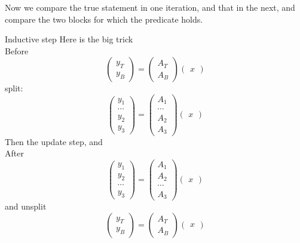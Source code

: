 Now we compare the true statement in one iteration,
and that in the next, and compare the two blocks
for which the predicate holds.

\begin{block}{Inductive step}
  \small
  Here is the big trick\\
  Before
  \[
  \begin{pmatrix}
    y_T\\ y_B
  \end{pmatrix}
  =
  \begin{pmatrix}
    A_T\\ A_B
  \end{pmatrix}
  \begin{pmatrix}
    x 
  \end{pmatrix}
  \]
  split:
  \[
  \begin{pmatrix}
    y_1\\ \cdots \\ y_2 \\ y_3
  \end{pmatrix}
  =
  \begin{pmatrix}
    A_1\\ \cdots \\ A_2 \\ A_3
  \end{pmatrix}
  \begin{pmatrix}
    x 
  \end{pmatrix}
  \]
  Then the update step, and \\ After
  \[
  \begin{pmatrix}
    y_1\\  y_2 \\ \cdots \\ y_3
  \end{pmatrix}
  =
  \begin{pmatrix}
    A_1 \\ A_2 \\ \cdots \\ A_3
  \end{pmatrix}
  \begin{pmatrix}
    x 
  \end{pmatrix}
  \]
  and unsplit
  \[
  \begin{pmatrix}
    y_T\\ y_B
  \end{pmatrix}
  =
  \begin{pmatrix}
    A_T\\ A_B
  \end{pmatrix}
  \begin{pmatrix}
    x 
  \end{pmatrix}
  \]
\end{block}

